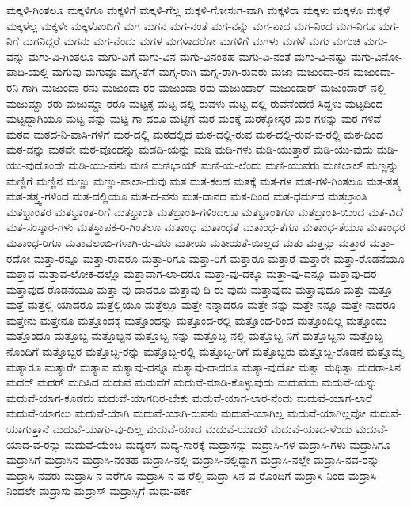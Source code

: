 {ಮಕ್ಕಳಿ-ಗಿಂತಲೂ
ಮಕ್ಕಳಿಗೂ
ಮಕ್ಕಳಿಗೆ
ಮಕ್ಕಳಿ-ಗೆಲ್ಲ
ಮಕ್ಕಳಿ-ಗೋಸುಗ-ವಾಗಿ
ಮಕ್ಕಳಿರಾ
ಮಕ್ಕಳು
ಮಕ್ಕಳೂ
ಮಕ್ಕಳೆ
ಮಕ್ಕಳೆಲ್ಲ
ಮಕ್ಕಳೇ
ಮಕ್ಕಳೊಂದಿಗೆ
ಮಗ
ಮಗನ
ಮಗ-ನಂತೆ
ಮಗ-ನನ್ನು
ಮಗ-ನಾದ
ಮಗ-ನಿಂದ
ಮಗ-ನಿಗೂ
ಮಗ-ನಿಗೆ
ಮಗನಿದ್ದರೆ
ಮಗನು
ಮಗ-ನೆಂದು
ಮಗಳ
ಮಗಳಾದರೋ
ಮಗಳಿಗೆ
ಮಗಳು
ಮಗಳೆ
ಮಗು
ಮಗುಚಿ
ಮಗು-ವನ್ನು
ಮಗು-ವಿ-ಗಿಂತಲೂ
ಮಗು-ವಿಗೆ
ಮಗು-ವಿನ
ಮಗು-ವಿನಂತಹ
ಮಗು-ವಿ-ನಂತೆ
ಮಗು-ವಿ-ನಷ್ಟು
ಮಗು-ವಿನೋ-ಪಾದಿ-ಯಲ್ಲಿ
ಮಗುವು
ಮಗುವೂ
ಮಗ್ನ-ತೆಗೆ
ಮಗ್ನ-ರಾಗಿ
ಮಗ್ನ-ರಾಗಿ-ರುವರು
ಮಜಾ
ಮಜುಂದಾ-ರನ
ಮಜುಂದಾ-ರನಿ-ಗಾಗಿ
ಮಜುಂದಾ-ರನು
ಮಜುಂದಾ-ರರ
ಮಜುಂದಾ-ರರು
ಮಜುಂದಾರ್
ಮಜುಂದಾರ್
ಮಜುಂದಾರ್-ನಲ್ಲಿ
ಮಜುಮ್ದಾ-ರರು
ಮಜುಮ್ದಾ-ರರೂ
ಮಟ್ಟಕ್ಕೆ
ಮಟ್ಟ-ದಲ್ಲಿ-ರುವಳು
ಮಟ್ಟ-ದಲ್ಲಿ-ರುವೆನೆಂದೆಣಿ-ಸಿದ್ದಳು
ಮಟ್ಟದಿಂದ
ಮಟ್ಟದ್ದಾಗಿಯೂ
ಮಟ್ಟ-ವನ್ನು
ಮಟ್ಟಿ-ಗಾ-ದರೂ
ಮಟ್ಟಿಗೆ
ಮಠ
ಮಠಕ್ಕೆ
ಮಠಕ್ಕೋಸ್ಕರ
ಮಠ-ಗಳನ್ನು
ಮಠ-ಗಳಿವೆ
ಮಠದ
ಮಠದ-ನಿ-ವಾಸಿ-ಗಳಿಗೆ
ಮಠ-ದಲ್ಲಿ
ಮಠದಲ್ಲಿದೆ
ಮಠ-ದಲ್ಲಿ-ರುವ
ಮಠ-ದಲ್ಲಿ-ರುವ-ವ-ರಲ್ಲಿ
ಮಠ-ದಿಂದ
ಮಠ-ವನ್ನು
ಮಠವೇ
ಮಠ-ವೊಂದನ್ನು
ಮಡದಿ-ಯನ್ನು
ಮಡಿ
ಮಡಿ-ಗಳು
ಮಡಿ-ಯುತ್ತಾರೆ
ಮಡಿ-ಯು-ವುದು
ಮಡಿ-ಯು-ವುದೊಂದೇ
ಮಡಿ-ಯು-ವೆನು
ಮಣಿ
ಮಣಿಭಾಯ್
ಮಣಿ-ಯ-ಲೆಂದು
ಮಣಿ-ಯುವರು
ಮಣಿಲಾಲ್
ಮಣ್ಣನ್ನು
ಮಣ್ಣಿಗೆ
ಮಣ್ಣಿನ
ಮಣ್ಣು
ಮಣ್ಣು-ಪಾಲಾ-ದುವು
ಮತ
ಮತ-ಕಲಹ
ಮತಕ್ಕೆ
ಮತ-ಗಳ
ಮತ-ಗಳಿ-ಗಿಂತಲೂ
ಮತ-ತತ್ತ್ವ
ಮತ-ತತ್ತ್ವ-ಗಳಿಂದ
ಮತ-ದಲ್ಲಿಯೂ
ಮತ-ದ-ವನು
ಮತ-ದಾನದ
ಮತ-ದಿಂದ
ಮತ-ಧರ್ಮದ
ಮತಬ್ರಾಂತಿ
ಮತಭ್ರಾಂತರ
ಮತಭ್ರಾಂತ-ರಿಗೆ
ಮತಭ್ರಾಂತಿ
ಮತಭ್ರಾಂತಿ-ಗಳಿಂದಲೂ
ಮತಭ್ರಾಂತಿಗೂ
ಮತಭ್ರಾಂತಿ-ಯಿಂದ
ಮತ-ವಿದೆ
ಮತ-ಸಂಸ್ಕಾರ-ಗಳು
ಮತಸ್ಥಾಪಕ-ರಿ-ಗಿಂತಲೂ
ಮತಾಂಧ
ಮತಾಂಧತೆ
ಮತಾಂಧ-ತೆಗೂ
ಮತಾಂಧ-ತೆಯೂ
ಮತಾಂಧರ
ಮತಾಂಧ-ರಿಗೂ
ಮತಾವಲಂಬಿ-ಗಳಾಗಿ-ರು-ವರು
ಮತೀಯ
ಮತೀಯತೆ-ಯಿಲ್ಲದ
ಮತು
ಮತ್ತನ್ನು
ಮತ್ತಾರ
ಮತ್ತಾ-ರದೋ
ಮತ್ತಾ-ರನ್ನೂ
ಮತ್ತಾ-ರಾದರೂ
ಮತ್ತಾ-ರಿಗೂ
ಮತ್ತಾ-ರಿಗೆ
ಮತ್ತಾರೂ
ಮತ್ತಾರೆ
ಮತ್ತಾರೇ
ಮತ್ತಾ-ರೊಡನೆಯೂ
ಮತ್ತಾವ
ಮತ್ತಾವ-ಲೋಕ-ದಲ್ಲೊ
ಮತ್ತಾವಾಗ-ಲಾ-ದರೂ
ಮತ್ತಾ-ವು-ದಕ್ಕೂ
ಮತ್ತಾ-ವು-ದನ್ನೂ
ಮತ್ತಾವು-ದರ
ಮತ್ತಾವುದ-ರೊಡನೆಯೂ
ಮತ್ತಾ-ವು-ದಾದರೂ
ಮತ್ತಾವು-ದಿ-ರು-ವುದು
ಮತ್ತಾವುದು
ಮತ್ತಾವುದೂ
ಮತ್ತು
ಮತ್ತೂ
ಮತ್ತೆ
ಮತ್ತೆಲ್ಲಿ-ಯಾದರೂ
ಮತ್ತೆಲ್ಲಿಯೂ
ಮತ್ತೆಲ್ಲೂ
ಮತ್ತೇ-ನನ್ನಾದರೂ
ಮತ್ತೇ-ನನ್ನು
ಮತ್ತೇ-ನನ್ನೂ
ಮತ್ತೇ-ನಾದರೂ
ಮತ್ತೇನು
ಮತ್ತೇನೂ
ಮತ್ತೊಂದಕ್ಕೆ
ಮತ್ತೊಂದನ್ನು
ಮತ್ತೊಂದ-ರಲ್ಲಿ
ಮತ್ತೊಂದ-ರಿಂದ
ಮತ್ತೊಂದಿಲ್ಲ
ಮತ್ತೊಂದು
ಮತ್ತೊಂದೂ
ಮತ್ತೊಬ್ಬ
ಮತ್ತೊಬ್ಬನ
ಮತ್ತೊಬ್ಬ-ನನ್ನು
ಮತ್ತೊಬ್ಬ-ನಲ್ಲಿ
ಮತ್ತೊಬ್ಬ-ನಿಗೆ
ಮತ್ತೊಬ್ಬನು
ಮತ್ತೊಬ್ಬ-ನೊಂದಿಗೆ
ಮತ್ತೊಬ್ಬರ
ಮತ್ತೊಬ್ಬ-ರನ್ನು
ಮತ್ತೊಬ್ಬ-ರಲ್ಲಿ
ಮತ್ತೊಬ್ಬ-ರಿಗೆ
ಮತ್ತೊಬ್ಬರು
ಮತ್ತೊಬ್ಬ-ರೊಡನೆ
ಮತ್ತೊಮ್ಮೆ
ಮತ್ಯಾರೂ
ಮತ್ಯಾರೇ
ಮತ್ಯಾವ
ಮತ್ಯಾವು-ದನ್ನೂ
ಮತ್ಯಾವು-ದಾದರೂ
ಮತ್ಯಾ-ವುದೋ
ಮತ್ವಾ
ಮಥಿತ್ವಾ
ಮದರಾ-ಸಿನ
ಮದರ್
ಮದರ್
ಮದಿಸಿದ
ಮದುವೆ
ಮದುವೆಗೆ
ಮದುವೆ-ಮಾಡಿ-ಕೊಳ್ಳುವುದು
ಮದುವೆಯ
ಮದುವೆ-ಯನ್ನು
ಮದುವೆ-ಯಾಗ-ಕೂಡದು
ಮದುವೆ-ಯಾಗದಿರ-ಬೇಕು
ಮದುವೆ-ಯಾಗ-ಲಾರ-ನೆಂದು
ಮದುವೆ-ಯಾಗ-ಲಾರೆ
ಮದುವೆ-ಯಾಗಲು
ಮದುವೆ-ಯಾಗಿ
ಮದುವೆ-ಯಾಗಿ-ರುವನು
ಮದುವೆ-ಯಾಗಿಲ್ಲ
ಮದುವೆ-ಯಾಗಿಲ್ಲವೋ
ಮದುವೆ-ಯಾಗುತ್ತಾನೆ
ಮದುವೆ-ಯಾಗು-ವು-ದಿಲ್ಲ
ಮದುವೆ-ಯಾದ
ಮದುವೆ-ಯಾದರೆ
ಮದುವೆ-ಯಾದ-ಳೆಂದು
ಮದುವೆ-ಯಾದ-ವ-ರನ್ನು
ಮದುವೆ-ಯೆಂಬ
ಮದ್ಯರಸ
ಮದ್ಯ-ಸಾರಕ್ಕೆ
ಮದ್ರಾಸನ್ನು
ಮದ್ರಾಸಿ-ಗಳ
ಮದ್ರಾಸಿ-ಗಳು
ಮದ್ರಾಸಿಗೂ
ಮದ್ರಾಸಿಗೆ
ಮದ್ರಾಸಿನ
ಮದ್ರಾಸಿ-ನಂತಹ
ಮದ್ರಾಸಿ-ನಲ್ಲಿ
ಮದ್ರಾಸಿ-ನಲ್ಲಿದ್ದಾಗ
ಮದ್ರಾಸಿ-ನಲ್ಲೇ
ಮದ್ರಾಸಿ-ನವ-ರನ್ನು
ಮದ್ರಾಸಿ-ನವರು
ಮದ್ರಾಸಿ-ನ-ವರೆಗೂ
ಮದ್ರಾಸಿ-ನ-ವ-ರೆಲ್ಲಿ
ಮದ್ರಾ-ಸಿನ-ವ-ರೊಂದಿಗೆ
ಮದ್ರಾಸಿ-ನಿಂದ
ಮದ್ರಾಸಿ-ನಿಂದಲೇ
ಮದ್ರಾಸು
ಮದ್ರಾಸ್
ಮದ್ರಾಸ್ಸಿಗೆ
ಮಧು-ಪರ್ಕ
}
